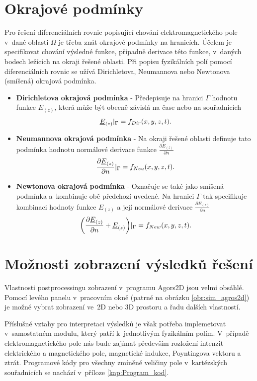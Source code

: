 \section{Okrajové podmínky}
Pro řešení diferenciálních rovnic popisující chování elektromagnetického pole v~dané oblasti $\Omega$ je třeba znát okrajové podmínky na hranicích. Účelem je specifikovat chování výsledné funkce, případně derivace této funkce, v~daných bodech ležících na okraji řešené oblasti. Při popisu fyzikálních polí pomocí diferenciálních rovnic se užívá Dirichletova, Neumannova nebo Newtonova (smíšená) okrajová podmínka.
\begin{itemize}
\item {\bf Dirichletova okrajová podmínka} - Předepisuje na hranici $\Gamma$ hodnotu funkce $E_{(z)}$, která může být obecně závislá na čase nebo na souřadnicích
\begin{displaymath}
	{\underline{E}}_{(z)}|_{\Gamma} = f_{Dir}(x,y,z,t). 
\end{displaymath}
\item {\bf Neumannova okrajová podmínka} - Na okraji řešené oblasti definuje tato podmínka hodnotu normálové derivace funkce $\frac{\partial E_{(z)}}{\partial n}$
\begin{displaymath}
	\frac{\partial {\underline{E}}_{(z)}}{\partial n}|_{\Gamma} = f_{Neu}(x,y,z,t). 
\end{displaymath}
\item {\bf Newtonova okrajová podmínka} - Označuje se také jako smíšená podmínka a~kombinuje obě předchozí uvedené. Na hranici $\Gamma$ tak specifikuje kombinaci hodnoty funkce $E_{(z)}$ a její normálové derivace $\frac{\partial E_{(z)}}{\partial n}$
\begin{displaymath}
	\bigg(\frac{\partial {\underline{E}}_{(z)}}{\partial n} + {\underline{E}}_{(z)}\bigg)|_{\Gamma} = f_{New}(x,y,z,t). 
\end{displaymath}
\end{itemize}

\section{Možnosti zobrazení výsledků řešení}
Vlastnosti postprocessingu zobrazení v~programu Agors2D jsou velmi obsáhlé. Pomocí levého panelu v~pracovním okně (patrné na obrázku \ref{obr:sim_agros2d}) je možné vybrat zobrazení ve~2D nebo 3D prostoru a řadu dalších vlastností. 

Příslušné vztahy pro interpretaci výsledků je však potřeba implemetovat v~samostatném modulu, který patří k~jednotlivým fyzikálním polím. V~případě elektromagnetického pole nás bude zajímat především rozložení intenzit elektrického a magnetického pole, magnetické indukce, Poyntingova vektoru a ztrát. Programové kódy pro všechny zmíněné veličiny pole v~kartézských souřadnicích se nachází v~příloze \ref{kap:Program_kod}. 
 
